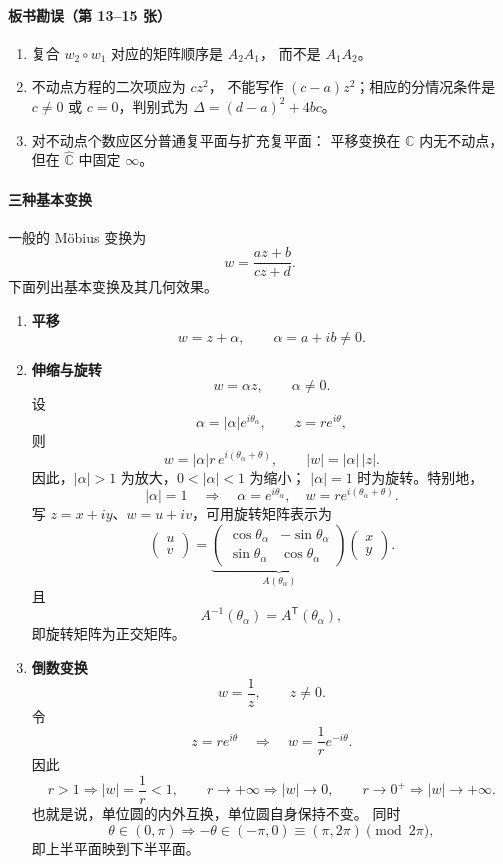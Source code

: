 \paragraph{板书勘误（第 13--15 张）}
\begin{enumerate}
  \item 复合 $w_2\circ w_1$ 对应的矩阵顺序是 $A_2A_1$，
  而不是 $A_1A_2$。
  \item 不动点方程的二次项应为 $cz^2$，
  不能写作 $(c-a)z^2$；相应的分情况条件是
  $c\ne0$ 或 $c=0$，判别式为
  $\Delta=(d-a)^2+4bc$。
  \item 对不动点个数应区分普通复平面与扩充复平面：
  平移变换在 $\mathbb C$ 内无不动点，
  但在 $\widehat{\mathbb C}$ 中固定 $\infty$。
\end{enumerate}



\paragraph{三种基本变换}
一般的 Möbius 变换为
\[
  w=\frac{az+b}{cz+d}.
\]
下面列出基本变换及其几何效果。

\begin{enumerate}
  \item \textbf{平移}
  \[
    w=z+\alpha,\qquad
    \alpha=a+ib\ne0.
  \]

  \item \textbf{伸缩与旋转}
  \[
    w=\alpha z,\qquad \alpha\ne0.
  \]
  设
  \[
    \alpha=|\alpha|e^{i\theta_\alpha},\qquad
    z=re^{i\theta},
  \]
  则
  \[
    w=|\alpha|r\,e^{i(\theta_\alpha+\theta)},
    \qquad |w|=|\alpha|\,|z|.
  \]
  因此，$|\alpha|>1$ 为放大，$0<|\alpha|<1$ 为缩小；
  $|\alpha|=1$ 时为旋转。特别地，
  \[
    |\alpha|=1\quad\Longrightarrow\quad
    \alpha=e^{i\theta_\alpha},\quad
    w=re^{i(\theta_\alpha+\theta)}.
  \]
  写 $z=x+iy$、$w=u+iv$，可用旋转矩阵表示为
  \[
    \begin{pmatrix}u\\v\end{pmatrix}
    =
    \underbrace{\begin{pmatrix}
      \cos\theta_\alpha&-\sin\theta_\alpha\\
      \sin\theta_\alpha&\cos\theta_\alpha
    \end{pmatrix}}_{A(\theta_\alpha)}
    \begin{pmatrix}x\\y\end{pmatrix}.
  \]
  且
  \[
    A^{-1}(\theta_\alpha)=A^{\mathsf T}(\theta_\alpha),
  \]
  即旋转矩阵为正交矩阵。

  \item \textbf{倒数变换}
  \[
    w=\frac1z,\qquad z\ne0.
  \]
  令
  \[
    z=re^{i\theta}\quad\Longrightarrow\quad
    w=\frac1r e^{-i\theta}.
  \]
  因此
  \[
    r>1\Longrightarrow |w|=\frac1r<1,\qquad
    r\to+\infty\Longrightarrow |w|\to0,\qquad
    r\to0^+\Longrightarrow |w|\to+\infty.
  \]
  也就是说，单位圆的内外互换，单位圆自身保持不变。
  同时
  \[
    \theta\in(0,\pi)
    \Longrightarrow
    -\theta\in(-\pi,0)\equiv(\pi,2\pi)\pmod{2\pi},
  \]
  即上半平面映到下半平面。
\end{enumerate}


